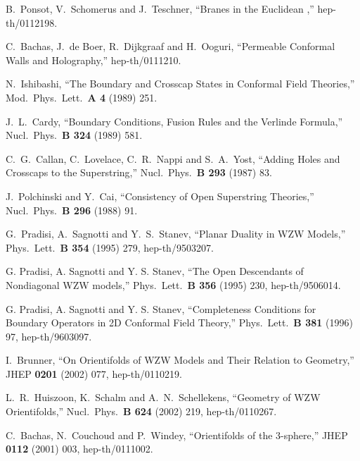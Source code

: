 \documentclass[a4paper,12pt]{article}
\begin{document}
\begin{thebibliography}{99}
B.~Ponsot, V.~Schomerus and J.~Teschner,
``Branes in the Euclidean \coordHE{},'' hep-th/0112198.

C.~Bachas, J.~de Boer, R.~Dijkgraaf and H.~Ooguri,
``Permeable Conformal Walls and Holography,'' hep-th/0111210.

N.~Ishibashi,
``The Boundary and Crosscap States in Conformal Field Theories,''
Mod.\ Phys.\ Lett.\ {\bf A 4} (1989) 251.

J.~L.~Cardy,
``Boundary Conditions, Fusion Rules and the Verlinde Formula,''
Nucl.\ Phys.\ {\bf B 324} (1989) 581.

C.~G.~Callan, C.~Lovelace, C.~R.~Nappi and S.~A.~Yost,
``Adding Holes and Crosscaps to the Superstring,''
Nucl.\ Phys.\ {\bf B 293} (1987) 83.

J.~Polchinski and Y.~Cai,
``Consistency of Open Superstring Theories,''
Nucl.\ Phys.\  {\bf B 296} (1988) 91.

G.~Pradisi, A.~Sagnotti and Y.~S.~Stanev,
``Planar Duality in \coordHE{} WZW Models,''
Phys.\ Lett.\ {\bf B 354} (1995) 279, hep-th/9503207.

 G. Pradisi, A. Sagnotti and Y. S. Stanev, ``The Open Descendants of
	Nondiagonal \coordHE{} WZW models,'' Phys.\ Lett.\ {\bf B 356}
	(1995) 230, hep-th/9506014. 

 G. Pradisi, A. Sagnotti and Y. S. Stanev, ``Completeness Conditions for
	Boundary Operators in 2D Conformal Field Theory,'' Phys.\ Lett.\
	{\bf B 381} (1996) 97, hep-th/9603097. 

I.~Brunner,
``On Orientifolds of WZW Models and Their Relation to Geometry,''
JHEP {\bf 0201} (2002) 077, hep-th/0110219.


L.~R.~Huiszoon, K.~Schalm and A.~N.~Schellekens,
``Geometry of WZW Orientifolds,''
Nucl.\ Phys.\ {\bf B 624} (2002) 219, hep-th/0110267.

C.~Bachas, N.~Couchoud and P.~Windey,
``Orientifolds of the 3-sphere,''
JHEP {\bf 0112} (2001) 003, hep-th/0111002.


\end{thebibliography}
\end{document}

